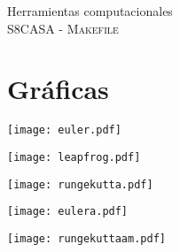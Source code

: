 \documentclass[11pt,letterpaper]{article}
\begin{document}
\begin{center}
{\Large Herramientas computacionales} \\
S8CASA - \textsc{Makefile}\\
\end{center}


\noindent
\section{Gr\'aficas}
\begin{center}
\texttt{[image: euler.pdf]} 
\begin{center}
\end{center}
\texttt{[image: leapfrog.pdf]} 
\end{center}
\begin{center}
\end{center}
\texttt{[image: rungekutta.pdf]} 
\begin{center}
\end{center}
\texttt{[image: eulera.pdf]} 
\begin{center}
\end{center}
\texttt{[image: rungekuttaam.pdf]} 
\end{document}
